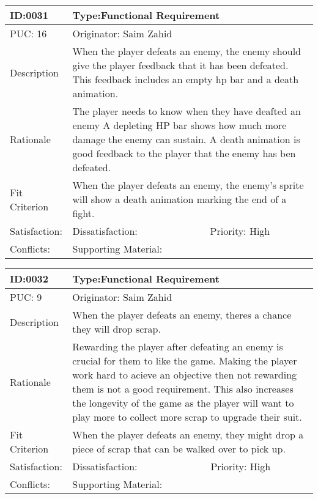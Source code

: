 \documentclass{article}
\begin{document}
	\begin{table}[H]
		\begin{tabular}{|l|l|l|}
			\hline
			ID:0031 & \multicolumn{2}{l|}{Type:Functional Requirement} \\ \hline
			PUC: 16 & \multicolumn{2}{l|}{Originator: Saim Zahid} \\ \hline
			Description & \multicolumn{2}{m{0.85\textwidth}|}{When the player defeats an enemy, the enemy should give the player feedback that it has been defeated. This feedback includes an empty hp bar and a death animation.} \\ \hline
			Rationale & \multicolumn{2}{m{0.85\textwidth}|}{The player needs to know when they have deafted an enemy A depleting HP bar shows how much more damage the enemy can sustain. A death animation is good feedback to the player that the enemy has ben defeated.} \\ \hline
			Fit Criterion & \multicolumn{2}{m{0.85\textwidth}|}{When the player defeats an enemy, the enemy's sprite will show a death animation marking the end of a fight.} \\ \hline
			Satisfaction: & Dissatisfaction: & Priority: High\\ \hline
			Conflicts: & \multicolumn{2}{l|}{Supporting Material:} \\ \hline
		\end{tabular}
	\end{table}

	\begin{table}[H]
		\begin{tabular}{|l|l|l|}
			\hline
			ID:0032 & \multicolumn{2}{l|}{Type:Functional Requirement} \\ \hline
			PUC: 9 & \multicolumn{2}{l|}{Originator: Saim Zahid} \\ \hline
			Description & \multicolumn{2}{m{0.85\textwidth}|}{When the player defeats an enemy, theres a chance they will drop scrap.} \\ \hline
			Rationale & \multicolumn{2}{m{0.85\textwidth}|}{Rewarding the player after defeating an enemy is crucial for them to like the game. Making the player work hard to acieve an objective then not rewarding them is not a good requirement. This also increases the longevity of the game as the player will want to play more to collect more scrap to upgrade their suit.} \\ \hline
			Fit Criterion & \multicolumn{2}{m{0.85\textwidth}|}{When the player defeats an enemy, they might drop a piece of scrap that can be walked over to pick up.} \\ \hline
			Satisfaction: & Dissatisfaction: & Priority: High\\ \hline
			Conflicts: & \multicolumn{2}{l|}{Supporting Material:} \\ \hline
		\end{tabular}
	\end{table}
\end{document}

